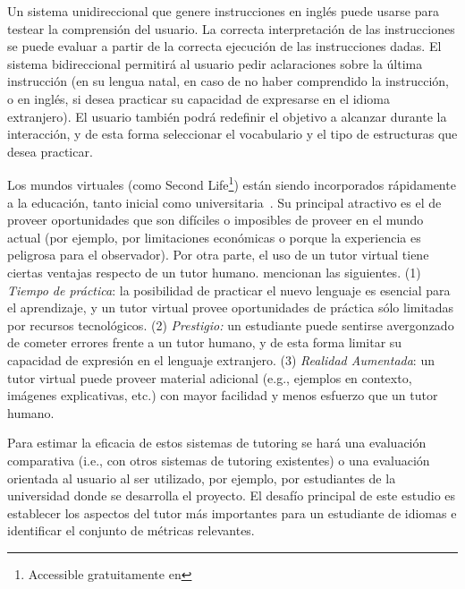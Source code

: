 Un sistema unidireccional que genere instrucciones en ingl\'es puede
usarse para testear la comprensi\'on del usuario.  La correcta
interpretaci\'on de las instrucciones se puede evaluar a partir de la
correcta ejecuci\'on de las instrucciones dadas.  El sistema
bidireccional permitir\'a al usuario pedir aclaraciones sobre la
\'ultima instrucci\'on (en su lengua natal, en caso de no haber comprendido
la instrucci\'on, o en ingl\'es, si desea practicar su
capacidad de expresarse en el idioma extranjero).  El usuario tambi\'en
podr\'a redefinir el objetivo a alcanzar durante la interacci\'on, y
de esta forma seleccionar el vocabulario y el tipo de estructuras que desea
practicar.

Los mundos virtuales (como Second Life\footnote{Accessible gratuitamente
en }) est\'an siendo incorporados r\'apidamente a la educaci\'on, tanto inicial como universitaria~\citep{Doswell05,molk:lear09}.  Su principal atractivo
es el de proveer oportunidades que son dif\'iciles o imposibles de
proveer en el mundo actual (por ejemplo, por limitaciones econ\'omicas
o porque la experiencia es peligrosa para el observador).
Por otra parte, el uso de un tutor virtual tiene ciertas ventajas
respecto de un tutor humano. \cite{engwall1020} mencionan las siguientes. (1) \emph{Tiempo de
pr\'actica}: la posibilidad de practicar el nuevo lenguaje es esencial
para el aprendizaje, y un tutor virtual provee oportunidades de pr\'actica
s\'olo limitadas por recursos tecnol\'ogicos. (2) \emph{Prestigio:} un
estudiante puede sentirse avergonzado de cometer errores frente a un tutor
humano, y de esta forma limitar su capacidad de expresi\'on en el lenguaje
extranjero. (3) \emph{Realidad Aumentada}: un tutor virtual puede proveer
material adicional (e.g., ejemplos en contexto, im\'agenes explicativas, etc.) con mayor facilidad y menos esfuerzo que un tutor humano.


Para estimar la eficacia de estos sistemas de tutoring se har\'a una
evaluaci\'on comparativa (i.e., con otros
sistemas de tutoring existentes) o una evaluaci\'on orientada al usuario al ser
utilizado, por ejemplo, por estudiantes de la universidad donde se desarrolla el
proyecto.
El desaf\'io principal de este
estudio es establecer los aspectos del tutor m\'as importantes para un
estudiante de idiomas e identificar el conjunto de m\'etricas relevantes.












